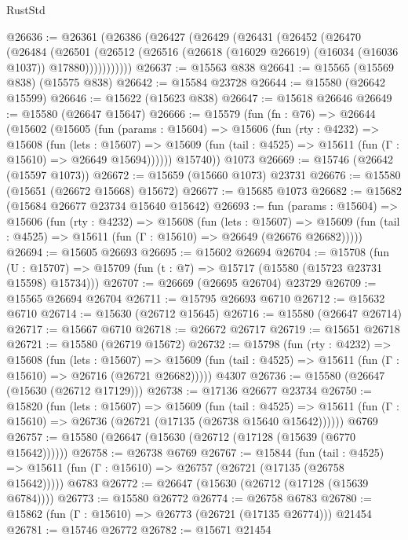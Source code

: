 \begin{lexlean}{RustStd}
\begin{coremodule}
@26636 := @26361
    (@26386
      (@26427
        (@26429
          (@26431
            (@26452
              (@26470
                (@26484
                  (@26501
                    (@26512
                      (@26516 (@26618 (@16029 @26619) (@16034 (@16036 @1037)) @17880)))))))))))
@26637 := @15563 @838
@26641 := @15565 (@15569 @838) (@15575 @838)
@26642 := @15584 @23728
@26644 := @15580 (@26642 @15599)
@26646 := @15622 (@15623 @838)
@26647 := @15618 @26646
@26649 := @15580 (@26647 @15647)
@26666 := @15579
    (fun (fn : @76) =>
    @26644
      (@15602
        (@15605
          (fun (params : @15604) =>
          @15606
            (fun (rty : @4232) =>
            @15608
              (fun (lets : @15607) =>
              @15609 (fun (tail : @4525) => @15611 (fun (Γ : @15610) => @26649 @15694))))))
        @15740))
    @1073
@26669 := @15746 (@26642 (@15597 @1073))
@26672 := @15659 (@15660 @1073) @23731
@26676 := @15580 (@15651 (@26672 @15668) @15672)
@26677 := @15685 @1073
@26682 := @15682 (@15684 @26677 @23734 @15640 @15642)
@26693 := fun (params : @15604) =>
  @15606
    (fun (rty : @4232) =>
    @15608
      (fun (lets : @15607) =>
      @15609 (fun (tail : @4525) => @15611 (fun (Γ : @15610) => @26649 (@26676 @26682)))))
@26694 := @15605 @26693
@26695 := @15602 @26694
@26704 := @15708
    (fun (U : @15707) => @15709 (fun (t : @7) => @15717 (@15580 (@15723 @23731 @15598) @15734)))
@26707 := @26669 (@26695 @26704) @23729
@26709 := @15565 @26694 @26704
@26711 := @15795 @26693 @6710
@26712 := @15632 @6710
@26714 := @15630 (@26712 @15645)
@26716 := @15580 (@26647 @26714)
@26717 := @15667 @6710
@26718 := @26672 @26717
@26719 := @15651 @26718
@26721 := @15580 (@26719 @15672)
@26732 := @15798
    (fun (rty : @4232) =>
    @15608
      (fun (lets : @15607) =>
      @15609 (fun (tail : @4525) => @15611 (fun (Γ : @15610) => @26716 (@26721 @26682)))))
    @4307
@26736 := @15580 (@26647 (@15630 (@26712 @17129)))
@26738 := @17136 @26677 @23734
@26750 := @15820
    (fun (lets : @15607) =>
    @15609
      (fun (tail : @4525) =>
      @15611 (fun (Γ : @15610) => @26736 (@26721 (@17135 (@26738 @15640 @15642))))))
    @6769
@26757 := @15580 (@26647 (@15630 (@26712 (@17128 (@15639 (@6770 @15642))))))
@26758 := @26738 @6769
@26767 := @15844
    (fun (tail : @4525) => @15611 (fun (Γ : @15610) => @26757 (@26721 (@17135 (@26758 @15642)))))
    @6783
@26772 := @26647 (@15630 (@26712 (@17128 (@15639 @6784))))
@26773 := @15580 @26772
@26774 := @26758 @6783
@26780 := @15862 (fun (Γ : @15610) => @26773 (@26721 (@17135 @26774))) @21454
@26781 := @15746 @26772
@26782 := @15671 @21454

\end{coremodule}
\end{lexlean}
